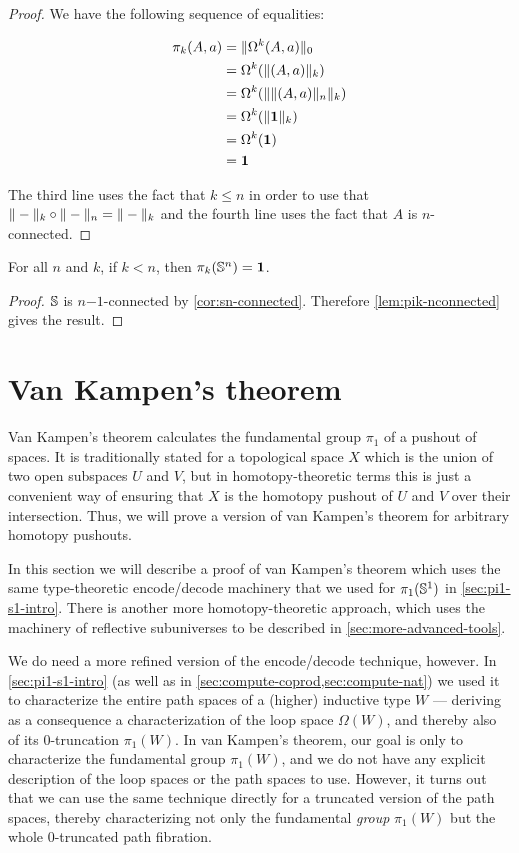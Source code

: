\begin{proof}
  We have the following sequence of equalities:

  \begin{align*}
    \pi_k(A,a) &= \trunc0{\Omega^k(A,a)} \\
    &= \Omega^k(\trunc k{(A,a)}) \\
    &= \Omega^k(\trunc k{\trunc n{(A,a)}}) \\
    &= \Omega^k(\trunc k{\unit}) \\
    &= \Omega^k(\unit) \\
    &= \unit
  \end{align*}

  The third line uses the fact that $k\le{}n$ in order to use that
  $\truncf k\circ\truncf n=\truncf k$ and the fourth line uses the fact that $A$ is
  $n$-connected.
\end{proof}

\begin{cor}[$\pi_{k<n}(\Sn ^n)$]
For all $n$ and $k$, if $k < n$, then $\pi_k(\Sn ^n) = \unit$.  
\end{cor}
\begin{proof}
$\Sn$ is $n\mathord{-}1$-connected by \autoref{cor:sn-connected}.  Therefore
\autoref{lem:pik-nconnected} gives the result.  
\end{proof}

\section{Van Kampen's theorem}
\label{sec:van-kampen}

Van Kampen's theorem calculates the fundamental group $\pi_1$ of a pushout of spaces.
It is traditionally stated for a topological space $X$ which is the union of two open subspaces $U$ and $V$, but in homotopy-theoretic terms this is just a convenient way of ensuring that $X$ is the homotopy pushout of $U$ and $V$ over their intersection.
Thus, we will prove a version of van Kampen's theorem for arbitrary homotopy pushouts.

In this section we will describe a proof of van Kampen's theorem which uses the same type-theoretic encode/decode machinery that we used for $\pi_1(\Sn^1)$ in \autoref{sec:pi1-s1-intro}.
There is another more homotopy-theoretic approach, which uses the machinery of reflective subuniverses to be described in \autoref{sec:more-advanced-tools}.

We do need a more refined version of the encode/decode technique, however.
In \autoref{sec:pi1-s1-intro} (as well as in \autoref{sec:compute-coprod,sec:compute-nat}) we used it to characterize the entire path spaces of a (higher) inductive type $W$ --- deriving as a consequence a characterization of the loop space $\Omega(W)$, and thereby also of its 0-truncation $\pi_1(W)$.
In van Kampen's theorem, our goal is only to characterize the fundamental group $\pi_1(W)$, and we do not have any explicit description of the loop spaces or the path spaces to use.
However, it turns out that we can use the same technique directly for a truncated version of the path spaces, thereby characterizing not only the fundamental \emph{group} $\pi_1(W)$ but the whole 0-truncated path fibration.


